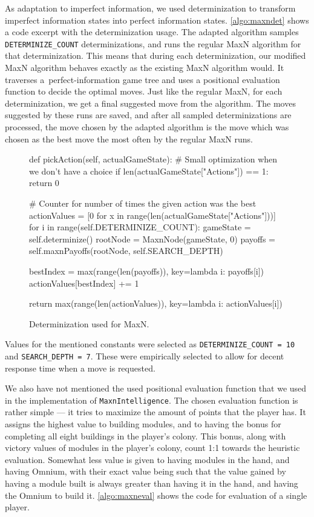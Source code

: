 As adaptation to imperfect information, we used determinization to transform
imperfect information states into perfect information states.
\autoref{algo:maxndet} shows a code excerpt with the determinization usage.
The adapted algorithm samples \texttt{DETERMINIZE\_COUNT} determinizations,
and runs the regular MaxN algorithm for that determinization. This means that during
each determinization, our modified MaxN algorithm behaves exactly as the existing
MaxN algorithm would. It traverses a~perfect-information game tree and uses a positional
evaluation function to decide the optimal moves. Just like the regular MaxN,
for each determinization, we get a final suggested move from the algorithm.
The moves suggested
by these runs are saved, and after all sampled determinizations are processed,
the move chosen by the adapted algorithm is the move which was chosen as the best
move the most often by the regular MaxN runs.

\begin{figure}[h!]
\begin{code}[commandchars=\\\{\},codes={\catcode`\$=3\catcode`\^=7\catcode`\_=8}]
def pickAction(self, actualGameState):
    \# Small optimization when we don't have a choice
    if len(actualGameState["Actions"]) == 1:
        return 0

    \# Counter for number of times the given action was the best
    actionValues = [0 for x in range(len(actualGameState["Actions"]))]
    for i in range(self.DETERMINIZE\_COUNT):
        gameState = self.determinize()
        rootNode = MaxnNode(gameState, 0)
        payoffs = self.maxnPayoffs(rootNode, self.SEARCH\_DEPTH)
        
        bestIndex = max(range(len(payoffs)), key=lambda i: payoffs[i])
        actionValues[bestIndex] += 1

    return max(range(len(actionValues)), key=lambda i: actionValues[i])
\end{code}
\caption{Determinization used for MaxN.}\label{algo:maxndet}
\end{figure}

Values for the mentioned constants were selected as \texttt{DETERMINIZE\_COUNT = 10}
and \texttt{SEARCH\_DEPTH = 7}. These were empirically selected to allow for decent
response time when a move is requested.

We also have not mentioned the used positional evaluation function that we used
in the implementation of \texttt{MaxnIntelligence}. The chosen evaluation function
is rather simple --- it tries to maximize the amount of points that the player has.
It assigns the highest value to building modules, and to having the bonus for completing
all eight buildings in the player's colony. This bonus, along with victory values of modules
in the player's colony, count 1:1 towards the heuristic evaluation. Somewhat less value is
given to having modules in the hand, and having Omnium, with their exact value being
such that the value gained by having a module built is always greater than having
it in the hand, and having the Omnium to build it. \autoref{algo:maxneval} shows
the code for evaluation of a single player.

